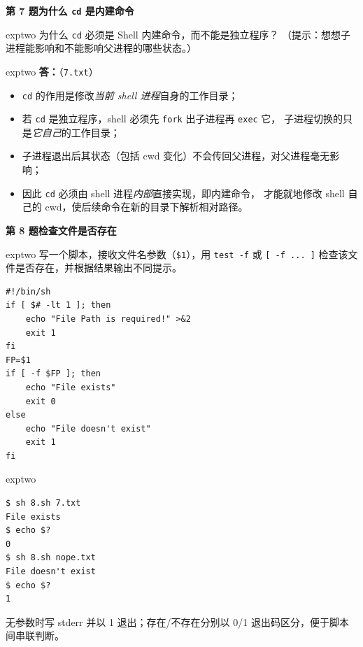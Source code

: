 \documentclass[11pt,a4paper,fontset=none]{ctexart}
\newcommand{\hwbanner}[3]{%
  \par\vspace{1.1em}
  \begin{tcolorbox}[enhanced, colback=#1!8, colframe=#1!75!black,
    boxrule=0.8pt, arc=2pt, left=7pt, right=7pt, top=4pt, bottom=4pt,
    before skip=1.1em]
    {\bfseries\color{#1!75!black}#2\qquad #3}
  \end{tcolorbox}
  \par\vspace{0.1em}\noindent\ignorespaces
}
\newcommand{\sublabel}[2]{%
  \par\vspace{0.8em}\noindent{\bfseries\color{#1!75!black}#2}\par\nobreak\vspace{0.25em}\noindent\ignorespaces
}
\begin{document}
\hwbanner{exptwo}{第 7 题}{为什么 \texttt{cd} 是内建命令}
\begin{reqbox}{exptwo}
  为什么 \texttt{cd} 必须是 Shell 内建命令，而不能是独立程序？
  （提示：想想子进程能影响和不能影响父进程的哪些状态。）
\end{reqbox}
\begin{resbox}{exptwo}
\textbf{答：}（\texttt{7.txt}）
\begin{itemize}[leftmargin=1.4em, itemsep=1pt]
  \item \texttt{cd} 的作用是修改\emph{当前 shell 进程}自身的工作目录；
  \item 若 \texttt{cd} 是独立程序，shell 必须先 \texttt{fork} 出子进程再 \texttt{exec} 它，
        子进程切换的只是\emph{它自己}的工作目录；
  \item 子进程退出后其状态（包括 cwd 变化）不会传回父进程，对父进程毫无影响；
  \item 因此 \texttt{cd} 必须由 shell 进程\emph{内部}直接实现，即内建命令，
        才能就地修改 shell 自己的 cwd，使后续命令在新的目录下解析相对路径。
\end{itemize}
\end{resbox}

\hwbanner{exptwo}{第 8 题}{检查文件是否存在}
\begin{reqbox}{exptwo}
  写一个脚本，接收文件名参数（\texttt{\$1}），用 \texttt{test -f} 或
  \texttt{[ -f ... ]} 检查该文件是否存在，并根据结果输出不同提示。
\end{reqbox}
\sublabel{exptwo}{\faCode\ 解答（\texttt{8.sh}）}
\begin{lstlisting}[style=shell]
#!/bin/sh
if [ $# -lt 1 ]; then
    echo "File Path is required!" >&2
    exit 1
fi
FP=$1
if [ -f $FP ]; then
    echo "File exists"
    exit 0
else
    echo "File doesn't exist"
    exit 1
fi
\end{lstlisting}
\begin{resbox}{exptwo}
\begin{lstlisting}[style=output]
$ sh 8.sh 7.txt
File exists
$ echo $?
0
$ sh 8.sh nope.txt
File doesn't exist
$ echo $?
1
\end{lstlisting}
无参数时写 stderr 并以 1 退出；存在/不存在分别以 0/1 退出码区分，便于脚本间串联判断。
\end{resbox}
\end{document}
